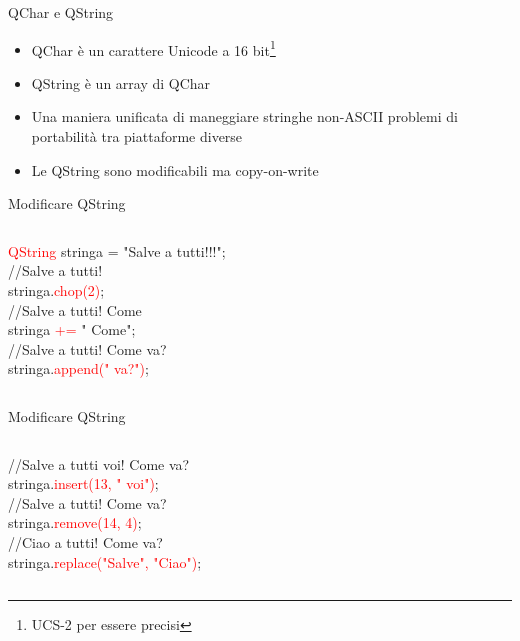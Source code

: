 \documentclass[10pt, aspectratio=169]{beamer}
\begin{document}
\begin{frame}{QChar e QString}
	\begin{itemize}
		\item QChar è un carattere Unicode a 16 bit\footnote{UCS-2 per essere precisi}
		\item QString è un array di QChar
		\item Una maniera unificata di maneggiare stringhe non-ASCII
		problemi di portabilità tra piattaforme diverse
		\item Le QString sono modificabili ma copy-on-write
	\end{itemize}	
\end{frame}

\begin{frame}{Modificare QString}
	\begin{columns}
		\begin{block}{}
			{\ttfamily \textcolor{red}{QString} stringa = "Salve a tutti!!!";\\
				\bigskip
				//Salve a tutti!\\
				stringa.\textcolor{red}{chop(2)};\\
				\bigskip
				//Salve a tutti! Come\\
				stringa \textcolor{red}{+=} " Come";\\
				\bigskip
				//Salve a tutti! Come va?\\
				stringa.\textcolor{red}{append(" va?")};}
		\end{block}
	\end{columns}
\end{frame}

\begin{frame}{Modificare QString}
	\begin{columns}
		\column{0.7\textwidth}
		\begin{block}{}
			{\ttfamily //Salve a tutti voi! Come va?\\
				stringa.\textcolor{red}{insert(13, " voi")};\\
				\bigskip
				//Salve a tutti! Come va?\\
				stringa.\textcolor{red}{remove(14, 4)};\\
				\bigskip
				//Ciao a tutti! Come va?\\
				stringa.\textcolor{red}{replace("Salve", "Ciao")};}
		\end{block}
	\end{columns}
\end{frame}
\end{document}
